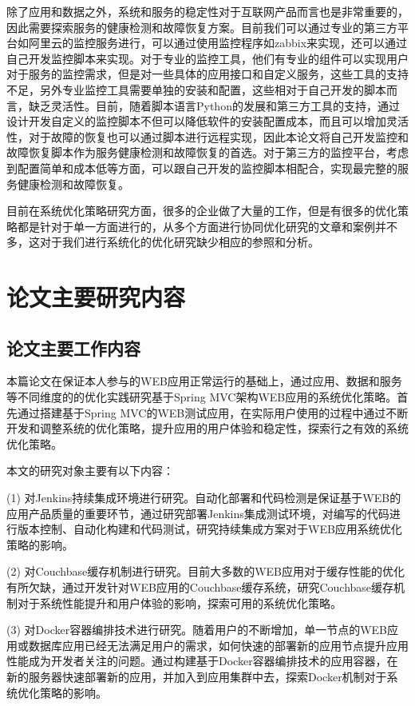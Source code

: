 \begin{enumerate}
  除了应用和数据之外，系统和服务的稳定性对于互联网产品而言也是非常重要的，因此需要探索服务的健康检测和故障恢复方案。目前我们可以通过专业的第三方平台如阿里云的监控服务进行，可以通过使用监控程序如zabbix来实现，还可以通过自己开发监控脚本来实现。对于专业的监控工具，他们有专业的组件可以实现用户对于服务的监控需求，但是对一些具体的应用接口和自定义服务，这些工具的支持不足，另外专业监控工具需要单独的安装和配置，这些相对于自己开发的脚本而言，缺乏灵活性。目前，随着脚本语言Python的发展和第三方工具的支持，通过设计开发自定义的监控脚本不但可以降低软件的安装配置成本，而且可以增加灵活性，对于故障的恢复也可以通过脚本进行远程实现，因此本论文将自己开发监控和故障恢复脚本作为服务健康检测和故障恢复的首选。对于第三方的监控平台，考虑到配置简单和成本低等方面，可以跟自己开发的监控脚本相配合，实现最完整的服务健康检测和故障恢复。
\end{enumerate}

目前在系统优化策略研究方面，很多的企业做了大量的工作，但是有很多的优化策略都是针对于单一方面进行的，从多个方面进行协同优化研究的文章和案例并不多，这对于我们进行系统化的优化研究缺少相应的参照和分析。

\section{论文主要研究内容}
\subsection{论文主要工作内容}
本篇论文在保证本人参与的WEB应用正常运行的基础上，通过应用、数据和服务等不同维度的的优化实践研究基于Spring MVC架构WEB应用的系统优化策略。首先通过搭建基于Spring MVC的WEB测试应用，在实际用户使用的过程中通过不断开发和调整系统的优化策略，提升应用的用户体验和稳定性，探索行之有效的系统优化策略。

本文的研究对象主要有以下内容：

(1) 对Jenkins持续集成环境进行研究。自动化部署和代码检测是保证基于WEB的应用产品质量的重要环节，通过研究部署Jenkins集成测试环境，对编写的代码进行版本控制、自动化构建和代码测试，研究持续集成方案对于WEB应用系统优化策略的影响。

(2) 对Couchbase缓存机制进行研究。目前大多数的WEB应用对于缓存性能的优化有所欠缺，通过开发针对WEB应用的Couchbase缓存系统，研究Couchbase缓存机制对于系统性能提升和用户体验的影响，探索可用的系统优化策略。

(3) 对Docker容器编排技术进行研究。随着用户的不断增加，单一节点的WEB应用或数据库应用已经无法满足用户的需求，如何快速的部署新的应用节点提升应用性能成为开发者关注的问题。通过构建基于Docker容器编排技术的应用容器，在新的服务器快速部署新的应用，并加入到应用集群中去，探索Docker机制对于系统优化策略的影响。

